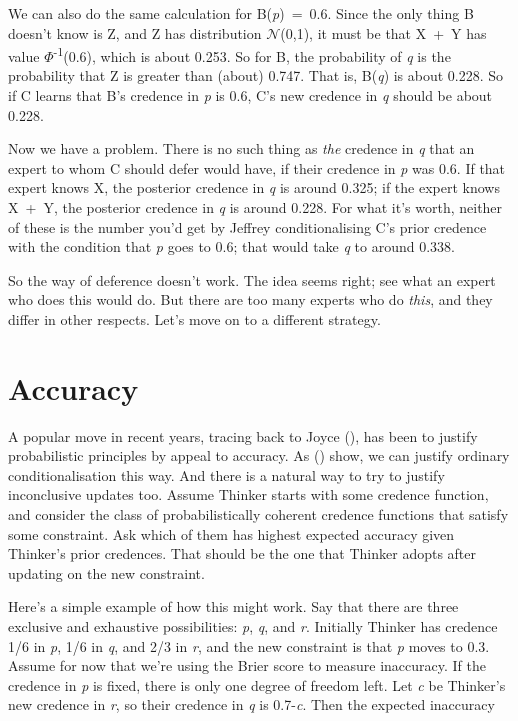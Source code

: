 \documentclass[
  11pt,
  letterpaper,
  DIV=11,
  numbers=noendperiod,
  twoside]{scrartcl}
\begin{document}
We can also do the same calculation for B(\emph{p})~=~0.6. Since the
only thing B doesn't know is Z, and Z has distribution
\(\mathcal{N}\)(0,1), it must be that X~+~Y has value
\(\Phi\)\textsuperscript{-1}(0.6), which is about 0.253. So for B, the
probability of \emph{q} is the probability that Z is greater than
(about) 0.747. That is, B(\emph{q}) is about 0.228. So if C learns that
B's credence in \emph{p} is 0.6, C's new credence in \emph{q} should be
about 0.228.

Now we have a problem. There is no such thing as \emph{the} credence in
\emph{q} that an expert to whom C should defer would have, if their
credence in \emph{p} was 0.6. If that expert knows X, the posterior
credence in \emph{q} is around 0.325; if the expert knows X~+~Y, the
posterior credence in \emph{q} is around 0.228. For what it's worth,
neither of these is the number you'd get by Jeffrey conditionalising C's
prior credence with the condition that \emph{p} goes to 0.6; that would
take \emph{q} to around 0.338.

So the way of deference doesn't work. The idea seems right; see what an
expert who does this would do. But there are too many experts who do
\emph{this}, and they differ in other respects. Let's move on to a
different strategy.

\section{Accuracy}\label{sec-accuracy}

A popular move in recent years, tracing back to Joyce
(), has been to justify probabilistic
principles by appeal to accuracy. As
() show,
we can justify ordinary conditionalisation this way. And there is a
natural way to try to justify inconclusive updates too. Assume Thinker
starts with some credence function, and consider the class of
probabilistically coherent credence functions that satisfy some
constraint. Ask which of them has highest expected accuracy given
Thinker's prior credences. That should be the one that Thinker adopts
after updating on the new constraint.

Here's a simple example of how this might work. Say that there are three
exclusive and exhaustive possibilities: \emph{p}, \emph{q}, and
\emph{r}. Initially Thinker has credence 1/6 in \emph{p}, 1/6 in
\emph{q}, and 2/3 in \emph{r}, and the new constraint is that \emph{p}
moves to 0.3. Assume for now that we're using the Brier score to measure
inaccuracy. If the credence in \emph{p} is fixed, there is only one
degree of freedom left. Let \emph{c} be Thinker's new credence in
\emph{r}, so their credence in \emph{q} is 0.7-\emph{c}. Then the
expected inaccuracy
\end{document}
